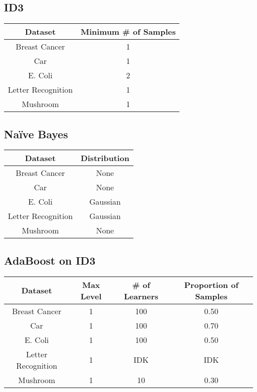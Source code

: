 \documentclass[11pt]{article}
\newcommand{\bb}{\textbf}
\begin{document}
\subsection{ID3}
\begin{tabular}{ |c|c| } \hline
  \bb{Dataset}       & \bb{Minimum \# of Samples} \\ \hline
  Breast Cancer      & 1                          \\ \hline
  Car                & 1                          \\ \hline
  E. Coli            & 2                          \\ \hline
  Letter Recognition & 1                          \\ \hline
  Mushroom           & 1                          \\ \hline
\end{tabular}


\subsection{Naïve Bayes}
\begin{tabular}{ |c|c| } \hline
  \bb{Dataset}       & \bb{Distribution} \\ \hline
  Breast Cancer      & None              \\ \hline
  Car                & None              \\ \hline
  E. Coli            & Gaussian          \\ \hline
  Letter Recognition & Gaussian          \\ \hline
  Mushroom           & None              \\ \hline
\end{tabular}

\subsection{AdaBoost on ID3}
\begin{tabular}{ |c|c|c|c| } \hline
  \bb{Dataset}       & \bb{Max Level} & \bb{\# of Learners} & Proportion of Samples \\ \hline
  Breast Cancer      & 1              & 100                 & 0.50                  \\ \hline
  Car                & 1              & 100                 & 0.70                  \\ \hline
  E. Coli            & 1              & 100                 & 0.50                  \\ \hline
  Letter Recognition & 1              & IDK                 & IDK                   \\ \hline
  Mushroom           & 1              & 10                  & 0.30                  \\ \hline
\end{tabular}
\end{document}
